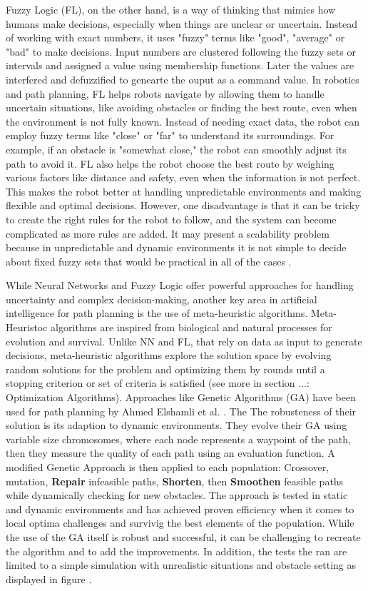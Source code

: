 Fuzzy Logic (FL), on the other hand, is a way of thinking that mimics how humans make decisions, especially when things are unclear 
or uncertain. Instead of working with exact numbers, it uses "fuzzy" terms like "good", "average" or "bad" to make 
decisions. Input numbers are clustered following the fuzzy sets or intervals and assigned a value using membership 
functions. Later the values are interfered and defuzzified to genearte the ouput as a command value. 
In robotics and path planning, FL helps robots navigate by allowing them to handle uncertain situations, 
like avoiding obstacles or finding the best route, even when the environment is not fully known. Instead of needing 
exact data, the robot can employ fuzzy terms like "close" or "far" to understand its surroundings. For example, if an 
obstacle is "somewhat close," the robot can smoothly adjust its path to avoid it. FL also helps the robot choose the best 
route by weighing various factors like distance and safety, even when the information is not perfect. This makes the 
robot better at handling unpredictable environments and making flexible and optimal decisions.
However, one 
disadvantage is that it can be tricky to create the right rules for the robot to follow, and the system can become 
complicated as more rules are added. It may present a scalability problem because in unpredictable and dynamic environments
it is not simple to decide about fixed fuzzy sets that would be practical in all of the cases \cite{R12}.

While Neural Networks and Fuzzy Logic offer powerful approaches for handling uncertainty and complex decision-making, 
another key area in artificial intelligence for path planning is the use of meta-heuristic algorithms.
Meta-Heuristoc algorithms are inspired from biological and natural processes for evolution and survival. 
Unlike NN and FL, that rely on data as input to generate decisions, meta-heuristic algorithms explore the solution
space by evolving random solutions for the problem and optimizing them by rounds until a stopping criterion or set
of criteria is satisfied (see more in section ...: Optimization Algorithms).
Approaches like Genetic Algorithms (GA) have been used for path planning by Ahmed Elshamli et al. \cite{R17}. The The robusteness of their 
solution is its adaption to dynamic environments. They evolve their GA using variable size chromosomes, where each node 
represents a waypoint of the path, then they measure the quality of each path using an evaluation function. A modified Genetic Approach is then 
applied to each population: Crossover, mutation, \textbf{Repair} infeasible paths, \textbf{Shorten}, then \textbf{Smoothen} 
feasible paths while dynamically checking for new obstacles.
The approach is tested in static and dynamic environments and has achieved proven efficiency when it comes 
to local optima challenges and survivig the best elements of the population. While the use of the GA itself is robust
and successful, it can be challenging to recreate the algorithm and to add the improvements. In addition, the tests
the ran are limited to a simple simulation with unrealistic situations and obstacle setting as displayed in 
figure . 

